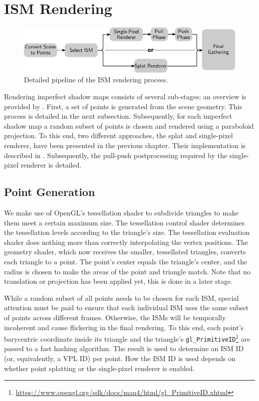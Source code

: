 \section{ISM Rendering}
\label{sec:impl:ismRendering}


\begin{figure}[htbp]
  \centering
  \includegraphics{graphics/ism_pipeline}
  \caption{Detailed pipeline of the ISM rendering process.}
  \label{fig:impl:ismRenderingPipeline}
\end{figure}

Rendering imperfect shadow maps consists of several sub-stages; an overview is provided by . First, a set of points is generated from the scene geometry. This process is detailed in the next subsection. Subsequently, for each imperfect shadow map a random subset of points is chosen and rendered using a paraboloid projection. To this end, two different approaches, the splat and single-pixel renderer, have been presented in the previous chapter. Their implementation is described in . Subsequently, the pull-push postprocessing required by the single-pixel renderer is detailed.

\subsection{Point Generation}
\label{sec:impl:pointGeneration}

We make use of OpenGL's tessellation shader to subdivide triangles to make them meet a certain maximum size. The tessellation control shader determines the tessellation levels according to the triangle's size. The tessellation evaluation shader does nothing more than correctly interpolating the vertex positions. The geometry shader, which now receives the smaller, tessellated triangles, converts each triangle to a point. The point's center equals the triangle's center, and the radius is chosen to make the areas of the point and triangle match. Note that no translation or projection has been applied yet, this is done in a later stage.

While a random subset of all points needs to be chosen for each ISM, special attention must be paid to ensure that each individual ISM uses the same subset of points across different frames. Otherwise, the ISMs will be temporally incoherent and cause flickering in the final rendering. To this end, each point's barycentric coordinate inside its triangle and the triangle's \texttt{gl\_PrimitiveID}\footnote{\url{https://www.opengl.org/sdk/docs/man4/html/gl_PrimitiveID.xhtml}} are passed to a fast hashing algorithm. The result is used to determine an ISM ID (or, equivalently, a VPL ID) per point. How the ISM ID is used depends on whether point splatting or the single-pixel renderer is enabled.




